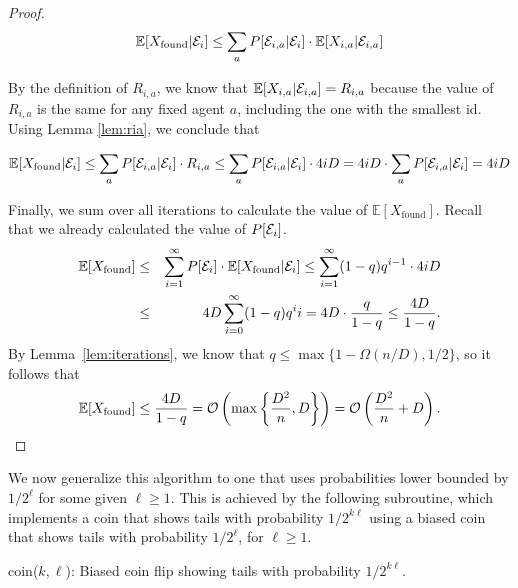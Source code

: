 \documentclass[11pt]{article}
\newcommand{\E}{\mathbb{E}}
\newcommand{\BO}{\mathcal{O}}
\begin{document}
\begin{proof}
\begin{equation*}
\E[X_{\text{found}}| {\cal E}_i] \leq \sum_{a} P[{\cal E}_{i,a} | {\cal E}_i] \cdot \E[X_{i,a} | {\cal E}_{i,a}]
\end{equation*}

By the definition of $R_{i,a}$, we know that $\E[X_{i,a} | {\cal E}_{i,a}] = R_{i,a}$ because the value of $R_{i,a}$ is the same for any fixed agent $a$, including the one with the smallest id. Using Lemma \ref{lem:ria}, we conclude that

\begin{equation*}
	\E[X_{\text{found}}| {\cal E}_i] \leq \sum_{a} P[{\cal E}_{i,a} | {\cal E}_i] \cdot R_{i,a} \leq \sum_{a} P[{\cal E}_{i,a} | {\cal E}_i] \cdot 4iD = 4iD \cdot \sum_{a} P[{\cal E}_{i,a} | {\cal E}_i] = 4iD
\end{equation*}

Finally, we sum over all iterations to calculate the value of $\E[X_{\text{found}}]$. Recall that we already calculated the value of $P[{\cal E}_i]$.
\begin{eqnarray*}
\E[X_{\text{found}}] &\leq & \sum_{i=1}^{\infty} P[{\cal E}_i] \cdot \E[X_{\text{found}}| {\cal E}_i] \leq \sum_{i=1}^{\infty}(1-q)q^{i-1}\cdot 4iD \\
 & \leq &  4D\sum_{i=0}^{\infty}(1-q)q^i i = 4D\cdot\frac{q}{1-q}\leq \frac{4D}{1-q}.
\end{eqnarray*}
By Lemma~\ref{lem:iterations}, we know that $q\leq\max\{1-\Omega(n/D),1/2\}$, so it follows that
\begin{equation*}
\E[X_{\text{found}}] \leq \frac{4D}{1-q}= \BO\left(\max\left\{\frac{D^2}{n},D\right\}\right)=\BO\left(\frac{D^2}{n}+D\right).\qedhere
\end{equation*}
\end{proof}

We now generalize this algorithm to one that uses probabilities lower bounded by $1/2^\ell$ for some given $\ell\geq 1$. This is achieved by the following subroutine, which implements a coin that shows tails with probability $1/2^{k\ell}$ using a biased coin that shows tails with probability $1/2^\ell$, for $\ell \geq 1$. 

\begin{algorithm}
\caption{coin($k,\ell$): Biased coin flip showing tails with probability $1/2^{k\ell}$.}
\label{algo:p_coin}
 {
	{
	\phantom{Xp}
	}
}
\phantom{Xp}
\end{algorithm}
\end{document}
